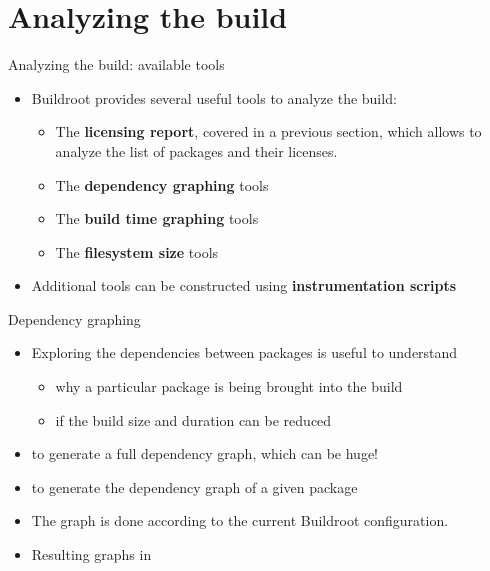 
\section{Analyzing the build}

\begin{frame}{Analyzing the build: available tools}
  \begin{itemize}
  \item Buildroot provides several useful tools to analyze the build:
    \begin{itemize}
    \item The {\bf licensing report}, covered in a previous section,
      which allows to analyze the list of packages and their licenses.
    \item The {\bf dependency graphing} tools
    \item The {\bf build time graphing} tools
    \item The {\bf filesystem size} tools
    \end{itemize}
  \item Additional tools can be constructed using {\bf instrumentation
      scripts}
  \end{itemize}
\end{frame}

\begin{frame}{Dependency graphing}
  \begin{itemize}
  \item Exploring the dependencies between packages is useful to
    understand
    \begin{itemize}
    \item why a particular package is being brought into the
      build
    \item if the build size and duration can be reduced
    \end{itemize}
  \item {} to generate a full dependency graph,
    which can be huge!
  \item {} to generate the dependency
    graph of a given package
  \item The graph is done according to the current Buildroot
    configuration.
  \item Resulting graphs in 
  \end{itemize}
\end{frame}

